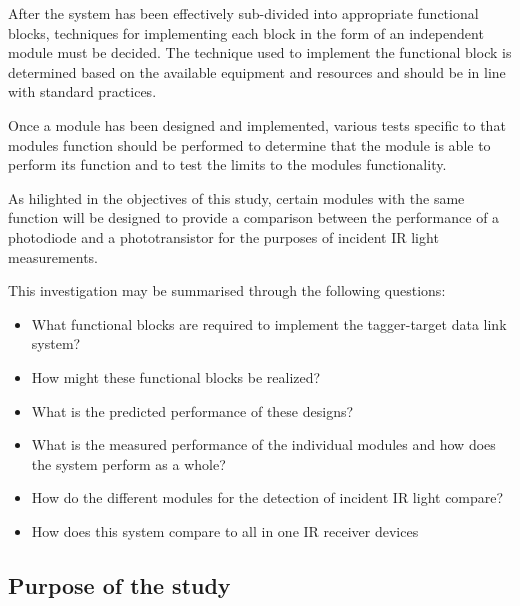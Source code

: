 After the system has been effectively sub-divided into appropriate functional blocks, techniques for implementing each block in the form of an independent module must be decided. The technique used to implement the functional block is determined based on the available equipment and resources and should be in line with standard practices.

Once a module has been designed and implemented, various tests specific to that modules function should be performed to determine that the module is able to perform its function and to test the limits to the modules functionality.

As hilighted in the objectives of this study, certain modules with the same function will be designed to provide a comparison between the performance of a photodiode and a phototransistor for the purposes of incident IR light measurements.

This investigation may be summarised through the following questions:

\begin{itemize}
	\item What functional blocks are required to implement the tagger-target data link system?
	\item How might these functional blocks be realized?
	\item What is the predicted performance of these designs?
	\item What is the measured performance of the individual modules and how does the system perform as a whole?
	\item How do the different modules for the detection of incident IR light compare?
	\item How does this system compare to all in one IR receiver devices
%	
\end{itemize}


\subsection{Purpose of the study}

